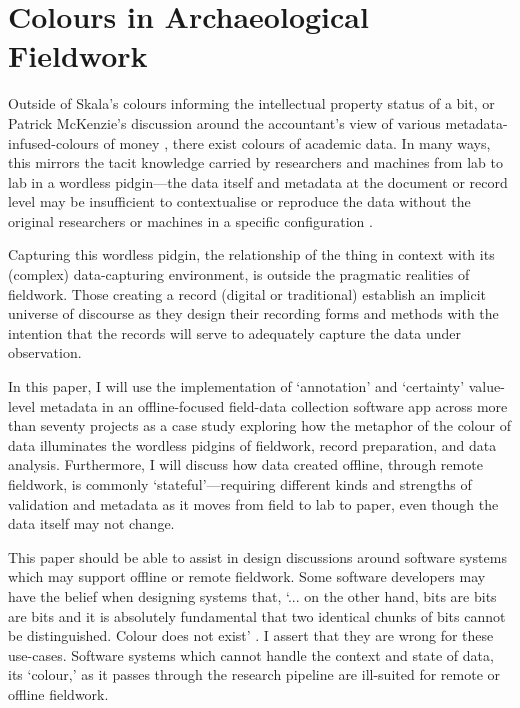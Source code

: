 \documentclass{scrarticle}
\begin{document}
\section{Colours in Archaeological Fieldwork}

Outside of Skala's colours informing the intellectual property status of a bit, or Patrick McKenzie's discussion around the accountant's view of various metadata-infused-colours of money \parencite*{Mckenzie2022-tt}, there exist colours of academic data. In many ways, this mirrors the tacit knowledge carried by researchers and machines from lab to lab in a wordless pidgin---the data itself and metadata at the document or record level may be insufficient to contextualise or reproduce the data without the original researchers or machines in a specific configuration \parencite[51]{Galison1997-dz}. 

Capturing this wordless pidgin, the relationship of the thing in context with its (complex) data-capturing environment, is outside the pragmatic realities of fieldwork. Those creating a record (digital or traditional) establish an implicit universe of discourse as they design their recording forms and methods with the intention that the records will serve to adequately capture the data under observation. 

In this paper, I will use the implementation of `annotation' and `certainty' value-level metadata in an offline-focused field-data collection software app across more than seventy projects as a case study  exploring how the metaphor of the colour of data illuminates the wordless pidgins of fieldwork, record preparation, and data analysis. Furthermore, I will discuss how data created offline, through remote fieldwork, is commonly `stateful'---requiring different kinds and strengths of validation and metadata as it moves from field to lab to paper, even though the data itself may not change. 

This paper should be able to assist in design discussions around software systems which may support offline or remote fieldwork. Some software developers may have the belief when designing systems that, `... on the other hand, bits are bits are bits and it is absolutely fundamental that two identical chunks of bits cannot be distinguished.  Colour does not exist' \parencite{Skala2004-zc}. I  assert that they are wrong for these use-cases. Software systems which cannot handle the context and state of data, its `colour,' as it passes through the research pipeline are ill-suited for remote or offline fieldwork.
\end{document}
